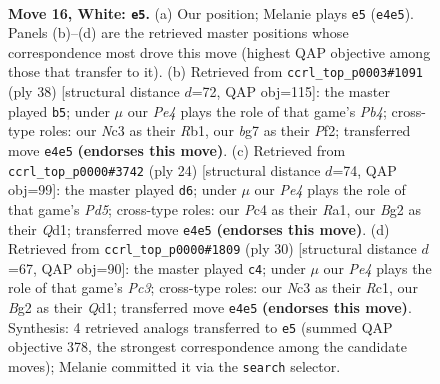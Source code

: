 \documentclass[11pt]{article}
\begin{document}
\clearpage

\begin{figure}[p]\centering
\begin{subfigure}{0.46\textwidth}\centering
\resizebox{\linewidth}{!}{%
\newchessgame
\chessboard[
  setfen={r1b1qrk1/5pb1/1pnp1np1/p1p4p/2P1PP1P/BPN5/P2P2B1/1R1QNRK1 w - - 1 16},
  showmover=false,
  pgfstyle=straightmove, color=movearrow, markmove={e4-e5}
]}
\caption{}
\end{subfigure}\hfill
\begin{subfigure}{0.46\textwidth}\centering
\resizebox{\linewidth}{!}{%
\newchessgame
\chessboard[
  setfen={rr4k1/3bqpbp/n1pp1np1/4p3/1PP1P3/2N1BNP1/5PBP/1R1Q1RK1 w - - 2 20},
  showmover=false,
  pgfstyle=straightmove, color=movearrow, markmove={b4-b5}
]}
\caption{}
\end{subfigure}
\\[4pt]
\begin{subfigure}{0.46\textwidth}\centering
\resizebox{\linewidth}{!}{%
\newchessgame
\chessboard[
  setfen={r1bq1rk1/p3ppbp/5np1/np1P4/2p2B2/2N2N1P/PP2BPP1/R2QR1K1 w - - 0 13},
  showmover=false,
  pgfstyle=straightmove, color=movearrow, markmove={d5-d6}
]}
\caption{}
\end{subfigure}\hfill
\begin{subfigure}{0.46\textwidth}\centering
\resizebox{\linewidth}{!}{%
\newchessgame
\chessboard[
  setfen={r3r1k1/1pqbnpbp/4n1p1/p2pp3/7P/BPPP1NP1/P2N1P2/2RQRBK1 w - - 0 16},
  showmover=false,
  pgfstyle=straightmove, color=movearrow, markmove={c3-c4}
]}
\caption{}
\end{subfigure}
\caption{\textbf{Move 16, White: \texttt{e5}.} (a) Our position; Melanie plays \texttt{e5} (\texttt{e4e5}). Panels (b)--(d) are the retrieved master positions whose correspondence most drove this move (highest QAP objective among those that transfer to it). (b) Retrieved from \texttt{ccrl\_top\_p0003\#1091} (ply 38) [structural distance $d$=72, QAP obj=115]: the master played \texttt{b5}; under $\mu$ our \emph{Pe4} plays the role of that game's \emph{Pb4}; cross-type roles: our \emph{N}c3 as their \emph{R}b1, our \emph{b}g7 as their \emph{P}f2; transferred move \texttt{e4e5} \textbf{(endorses this move)}. (c) Retrieved from \texttt{ccrl\_top\_p0000\#3742} (ply 24) [structural distance $d$=74, QAP obj=99]: the master played \texttt{d6}; under $\mu$ our \emph{Pe4} plays the role of that game's \emph{Pd5}; cross-type roles: our \emph{P}c4 as their \emph{R}a1, our \emph{B}g2 as their \emph{Q}d1; transferred move \texttt{e4e5} \textbf{(endorses this move)}. (d) Retrieved from \texttt{ccrl\_top\_p0000\#1809} (ply 30) [structural distance $d$=67, QAP obj=90]: the master played \texttt{c4}; under $\mu$ our \emph{Pe4} plays the role of that game's \emph{Pc3}; cross-type roles: our \emph{N}c3 as their \emph{R}c1, our \emph{B}g2 as their \emph{Q}d1; transferred move \texttt{e4e5} \textbf{(endorses this move)}. Synthesis: 4 retrieved analogs transferred to \texttt{e5} (summed QAP objective 378, the strongest correspondence among the candidate moves); Melanie committed it via the \texttt{search} selector.}
\label{fig:thought-m30}
\end{figure}
\end{document}
